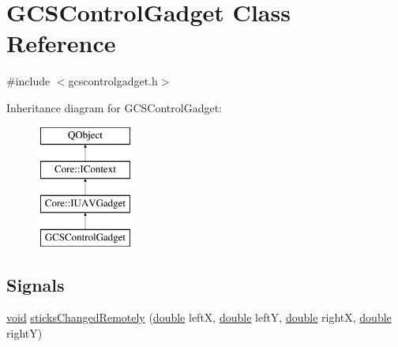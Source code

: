 \hypertarget{class_g_c_s_control_gadget}{\section{G\-C\-S\-Control\-Gadget Class Reference}
\label{class_g_c_s_control_gadget}
}


{\ttfamily \#include $<$gcscontrolgadget.\-h$>$}

Inheritance diagram for G\-C\-S\-Control\-Gadget\-:\begin{figure}[H]
\begin{center}
\leavevmode
\includegraphics[height=4.000000cm]{class_g_c_s_control_gadget}
\end{center}
\end{figure}
\subsection*{Signals}
\begin{DoxyCompactItemize}
\item 
\hyperlink{group___u_a_v_objects_plugin_ga444cf2ff3f0ecbe028adce838d373f5c}{void} \hyperlink{group___g_c_s_control_gadget_plugin_gadf32420d5e7ad8ff1d32752209406e28}{sticks\-Changed\-Remotely} (\hyperlink{_super_l_u_support_8h_a8956b2b9f49bf918deed98379d159ca7}{double} left\-X, \hyperlink{_super_l_u_support_8h_a8956b2b9f49bf918deed98379d159ca7}{double} left\-Y, \hyperlink{_super_l_u_support_8h_a8956b2b9f49bf918deed98379d159ca7}{double} right\-X, \hyperlink{_super_l_u_support_8h_a8956b2b9f49bf918deed98379d159ca7}{double} right\-Y)
\end{DoxyCompactItemize}
